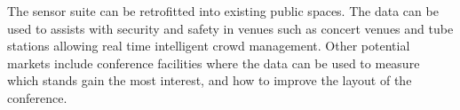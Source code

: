 \documentclass[12pt, oneside]{article}
\begin{document}
The sensor suite can be retrofitted into existing public spaces.  The data can be used to assists with security and safety in venues such as concert venues and tube stations allowing real time intelligent crowd management.   Other potential markets include conference facilities where the data can be used to measure which stands gain the most interest, and how to improve the layout of the conference.   
\end{document}

